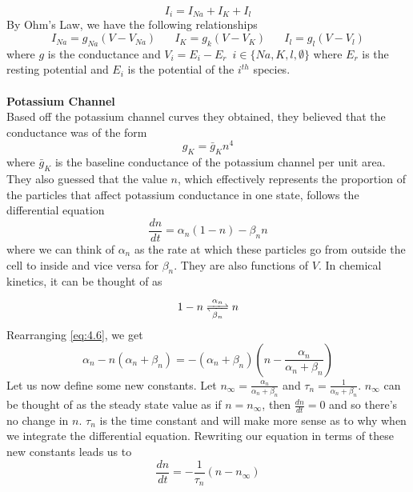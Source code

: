\documentclass{article}
\newcommand{\od}[2]{\frac{d #1}{d #2}}
\numberwithin{equation}{section}
\begin{document}
\begin{equation}
    I_i = I_{Na}+I_K+I_l
\end{equation}
By Ohm's Law, we have the following relationships
\begin{equation}
    I_{Na} = g_{Na}(V-V_{Na}) \hspace{20pt} I_K=g_k(V-V_K) \hspace{20pt} I_l = g_l(V-V_l)
\end{equation}
where $g$ is the conductance and $V_i = E_i - E_r \,\,\, i\in \{Na,K,l,\emptyset\}$ where $E_r$ is the resting potential and $E_i$ is the potential of the $i^{th}$ species.\\\\
\textbf{Potassium Channel}\\
Based off the potassium channel curves they obtained, they believed that the conductance was of the form 
\begin{equation}
    g_K = \bar{g}_Kn^4
\end{equation}
where $\bar{g}_K$ is the baseline conductance of the potassium channel per unit area. They also guessed that the value $n$, which effectively represents the proportion of the particles that affect potassium conductance in one state, follows the differential equation 
\begin{equation}
    \od{n}{t}=\alpha_n(1-n)-\beta_n n \label{eq:4.6}
\end{equation}
where we can think of $\alpha_n$ as the rate at which these particles go from outside the cell to inside and vice versa for $\beta_n$. They are also functions of $V$. In chemical kinetics, it can be thought of as 
\begin{equation}
    1-n \ce{<=>[\alpha_n][\beta_n]}n
\end{equation}
Rearranging \eqref{eq:4.6}, we get 
\begin{equation*}
    \alpha_n - n(\alpha_n+\beta_n) = -(\alpha_n+\beta_n)\left(n-\frac{\alpha_n}{\alpha_n+\beta_n} \right)
\end{equation*}
Let us now define some new constants. Let $n_\infty = \frac{\alpha_n}{\alpha_n+\beta_n}$ and $\tau_n=\frac{1}{\alpha_n+\beta_n}$. $n_\infty$ can be thought of as the steady state value as if $n=n_\infty$, then $\od{n}{t} = 0$ and so there's no change in $n$. $\tau_n$ is the time constant and will make more sense as to why when we integrate the differential equation. Rewriting our equation in terms of these new constants leads us to 
\begin{equation}
    \od{n}{t} =-\frac{1}{\tau_n}(n-n_\infty) 
\end{equation}
\end{document}

